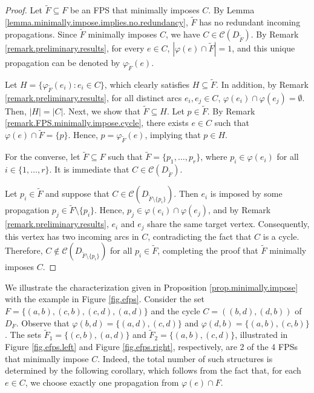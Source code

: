 \documentclass{article}
\newcommand{\CC}{{\mathscr C}}
\begin{document}
\begin{proof}
Let $\tilde F \subseteq F$ be an FPS that minimally imposes $C$.
By Lemma \ref{lemma.minimally.impose.implies.no.redundancy}, $\tilde F$ has no redundant incoming propagations.
Since $\tilde F$ minimally imposes $C$, we have $C \in \CC(D_{\tilde F})$.
By Remark \ref{remark.preliminary.results}, for every $e \in C$, $|\varphi(e) \cap \tilde F| = 1$, and this unique propagation can be denoted by $\varphi_{\tilde F}(e)$.

Let $H = \{\varphi_{\tilde F}(e_i) : e_i \in C\}$, which clearly satisfies $H \subseteq \tilde F$.
In addition, by Remark \ref{remark.preliminary.results}, for all distinct arcs $e_i, e_j \in C$, $\varphi(e_i) \cap \varphi(e_j) = \emptyset$. Then, $|H| = |C|$.
Next, we show that $\tilde F \subseteq H$.
Let $p \in \tilde F$.
By Remark \ref{remark.FPS.minimally.impose.cycle}, there exists $e \in C$ such that $\varphi(e) \cap \tilde F = \{p\}$.
Hence, $p = \varphi_{\tilde F}(e)$, implying that $p \in H$. 

For the converse, let $\tilde F \subseteq F$ such that $\tilde F = \{p_1, \ldots, p_r\}$, where $p_i \in \varphi(e_i)$ for all $i \in \{1,\ldots,r\}$.
It is immediate that $C \in \CC(D_{\tilde F})$.

Let $p_i \in \tilde F$ and suppose that $C \in \CC(D_{\tilde F \setminus \{p_i\}})$. 
Then $e_i$ is imposed by some propagation $p_j \in \tilde F \setminus \{p_i\}$.
Hence, $p_j \in \varphi(e_i) \cap \varphi(e_j)$, and by Remark \ref{remark.preliminary.results}, $e_i$ and $e_j$ share the same target vertex.
Consequently, this vertex has two incoming arcs in $C$, contradicting the fact that $C$ is a cycle.
Therefore, $C \notin \CC(D_{\tilde F \setminus \{p_i\}})$ for all $p_i \in \tilde F$, completing the proof that $\tilde F$ minimally imposes $C$.
\end{proof}

We illustrate the characterization given in Proposition \ref{prop.minimally.impose} with the example in Figure \ref{fig.efps}.
Consider the set $F = \{(a,b),(c,b),(c,d),(a,d)\}$ and the cycle $C = ((b,d),(d,b))$ of $D_F$.
Observe that $\varphi(b,d) = \{(a,d),(c,d)\}$ and $\varphi(d,b) = \{(a,b),(c,b)\}$.
The sets $\tilde F_1 = \{(c,b),(a,d)\}$ and $\tilde F_2 = \{(a,b),(c,d)\}$, illustrated in Figure \ref{fig.efps.left} and Figure \ref{fig.efps.right}, respectively, are 2 of the 4 FPSs that minimally impose $C$.
Indeed, the total number of such structures is determined by the following corollary, which follows from the fact that, for each $e \in C$, we choose exactly one propagation from $\varphi(e) \cap F$.
\end{document}
